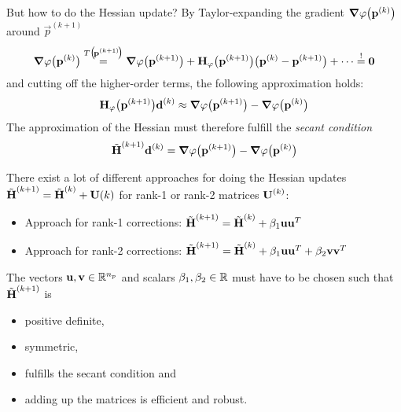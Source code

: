 			But how to do the Hessian update? By Taylor-expanding the gradient \( \grad{\varphi}\big(\boldsymbol{\mathrm{p}}^{(k)}\big) \) around \( \vec{p}^{(k + 1)} \)
			\begin{align*}
				\grad{\varphi}\big(\boldsymbol{\mathrm{p}}^{(k)}\big) \overset{T\big(\!\boldsymbol{\mathrm{p}}^{(k + 1)}\!\big)}{=} \grad{\varphi}\big(\boldsymbol{\mathrm{p}}^{(k + 1)}\big) + \boldsymbol{\mathrm{H}}_\varphi\big(\boldsymbol{\mathrm{p}}^{(k + 1)}\big) \big( \boldsymbol{\mathrm{p}}^{(k)} - \boldsymbol{\mathrm{p}}^{(k + 1)} \big) + \cdots \overset{!}{=} \boldsymbol{\mathrm{0}}
			\end{align*}
			and cutting off the higher-order terms, the following approximation holds:
			\begin{align*}
				\boldsymbol{\mathrm{H}}_\varphi\big(\boldsymbol{\mathrm{p}}^{(k + 1)}\big) \boldsymbol{\mathrm{d}}^{(k)} \approx \grad{\varphi}\big(\boldsymbol{\mathrm{p}}^{(k + 1)}\big) - \grad{\varphi}\big(\boldsymbol{\mathrm{p}}^{(k)}\big)
			\end{align*}
			The approximation of the Hessian must therefore fulfill the \emph{secant condition}
			\begin{align*}
				\tilde{\boldsymbol{\mathrm{H}}}^{(k + 1)} \boldsymbol{\mathrm{d}}^{(k)} = \grad{\varphi}\big(\boldsymbol{\mathrm{p}}^{(k + 1)}\big) - \grad{\varphi}\big(\boldsymbol{\mathrm{p}}^{(k)}\big)
			\end{align*}
			
			There exist a lot of different approaches for doing the Hessian updates \( \tilde{\boldsymbol{\mathrm{H}}}^{(k + 1)} = \tilde{\boldsymbol{\mathrm{H}}}^{(k)} + \boldsymbol{\mathrm{U}}{(k)} \) for rank-1 or rank-2 matrices \(\boldsymbol{\mathrm{U}}^{(k)}\):
			\begin{itemize}
				\item Approach for rank-1 corrections: \tabto{6cm} \( \tilde{\boldsymbol{\mathrm{H}}}^{(k + 1)} = \tilde{\boldsymbol{\mathrm{H}}}^{(k)} + \beta_1 \boldsymbol{\mathrm{u}} \boldsymbol{\mathrm{u}}^T \)
				\item Approach for rank-2 corrections: \tabto{6cm} \( \tilde{\boldsymbol{\mathrm{H}}}^{(k + 1)} = \tilde{\boldsymbol{\mathrm{H}}}^{(k)} + \beta_1 \boldsymbol{\mathrm{u}} \boldsymbol{\mathrm{u}}^T + \beta_2 \boldsymbol{\mathrm{v}} \boldsymbol{\mathrm{v}}^T \)
			\end{itemize}
			The vectors \( \boldsymbol{\mathrm{u}}, \boldsymbol{\mathrm{v}} \in \mathbb{R}^{n_p} \) and scalars \( \beta_1, \beta_2 \in \mathbb{R} \) must have to be chosen such that \( \tilde{\boldsymbol{\mathrm{H}}}^{(k + 1)} \) is
			\begin{itemize}
				\item positive definite,
				\item symmetric,
				\item fulfills the secant condition and
				\item adding up the matrices is efficient and robust.
			\end{itemize}

